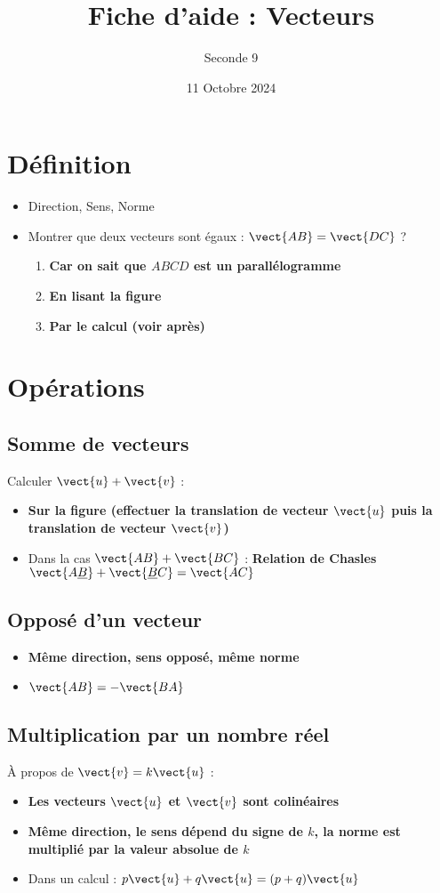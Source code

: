 \documentclass{article}
\title{Fiche d'aide : Vecteurs}
\date{11 Octobre 2024}
\author{Seconde 9}
\begin{document}
\maketitle

\section{Définition}
\begin{itemize}
\item Direction, Sens, Norme
\item Montrer que deux vecteurs sont égaux : $\vect{AB} = \vect{DC}$ ?
\begin{enumerate}
\item \textbf{Car on sait que $ABCD$ est un parallélogramme}
\item \textbf{En lisant la figure}
\item \textbf{Par le calcul (voir après)}
\end{enumerate}
\end{itemize}
\section{Opérations}
\subsection{Somme de vecteurs}
Calculer $\vect{u} + \vect{v}$ :
\begin{itemize}
\item \textbf{Sur la figure (effectuer la translation de vecteur $\vect{u}$ puis la translation de vecteur $\vect{v}$)}
\item Dans la cas $\vect{AB} + \vect{BC}$ : \textbf{Relation de Chasles $\vect{A\underline{B}} + \vect{\underline{B}C} = \vect{AC}$}
\end{itemize}
\subsection{Opposé d'un vecteur}
\begin{itemize}
\item \textbf{Même direction, sens opposé, même norme} 
\item $\vect{AB} = - \vect{BA}$
\end{itemize}
\subsection{Multiplication par un nombre réel}
À propos de $\vect{v} = k \vect{u}$ :
\begin{itemize}
\item \textbf{Les vecteurs $\vect{u}$ et $\vect{v}$ sont colinéaires}
\item \textbf{Même direction, le sens dépend du signe de $k$, la norme est multiplié par la valeur absolue de $k$}
\item Dans un calcul : \textbf{$p \vect{u} + q \vect{u} = (p + q) \vect{u}$}
\end{itemize}
\end{document}
